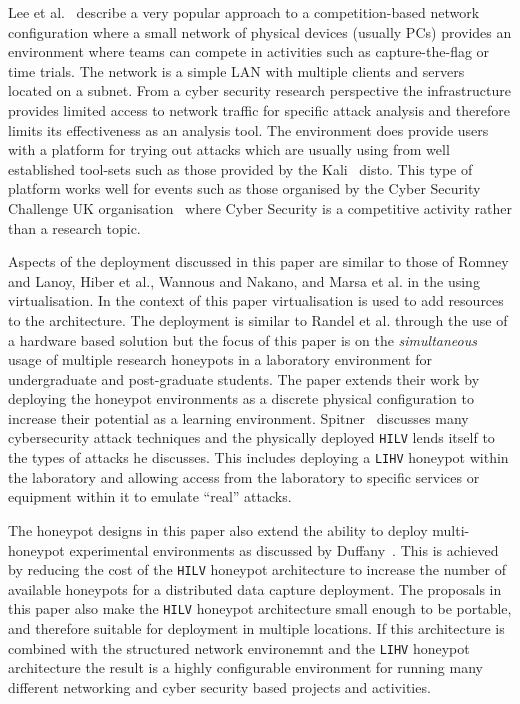 \documentclass[10pt,journal]{IEEEtran}
\begin{document}
Lee et al.~\cite{LUFC:11} describe a very popular approach to a competition-based network configuration where a small network of physical devices (usually PCs) provides an environment where teams can compete in activities such as capture-the-flag or time trials. The network is a simple LAN with multiple clients and servers located on a subnet. From a cyber security research perspective the infrastructure provides limited access to network traffic for specific attack analysis and therefore limits its effectiveness as an analysis tool. The environment does provide users with a platform for trying out attacks which are usually using from well established tool-sets such as those provided by the Kali~\cite{OS:17} disto. This type of platform works well for events such as those organised by the Cyber Security Challenge UK organisation~\cite{CSCUK:18} where Cyber Security is a competitive activity rather than a research topic.   

Aspects of the deployment discussed in this paper are similar to those of Romney and Lanoy, Hiber et al., Wannous and Nakano, and Marsa et al. in the using virtualisation. In the context of this paper virtualisation is used to add resources to the architecture. The deployment is similar to Randel et al. through the use of a hardware based solution but the focus of this paper is on the \textit{simultaneous} usage of multiple research honeypots in a laboratory environment for undergraduate and post-graduate students. The paper extends their work by deploying the honeypot environments as a discrete physical configuration to increase their potential as a learning environment. Spitner~\cite{LS:03} discusses many cybersecurity attack techniques and the physically deployed \texttt{HILV} lends itself to the types of attacks he discusses. This includes deploying a \texttt{LIHV} honeypot within the laboratory and allowing access from the laboratory to specific services or equipment within it to emulate ``real'' attacks.

The honeypot designs in this paper also extend the ability to deploy multi-honeypot
experimental environments as discussed by Duffany~\cite{JD:08}. This is
achieved by reducing the cost of the \texttt{HILV} honeypot architecture to increase the
number of available honeypots for a distributed data capture deployment. The
proposals in this paper also make the \texttt{HILV} honeypot architecture small
enough to be portable, and therefore suitable for deployment in 
multiple locations. If this architecture is combined with the structured network environemnt and the \texttt{LIHV} honeypot architecture the result is a highly configurable environment for running many different networking and cyber security based projects and activities.
\end{document}
